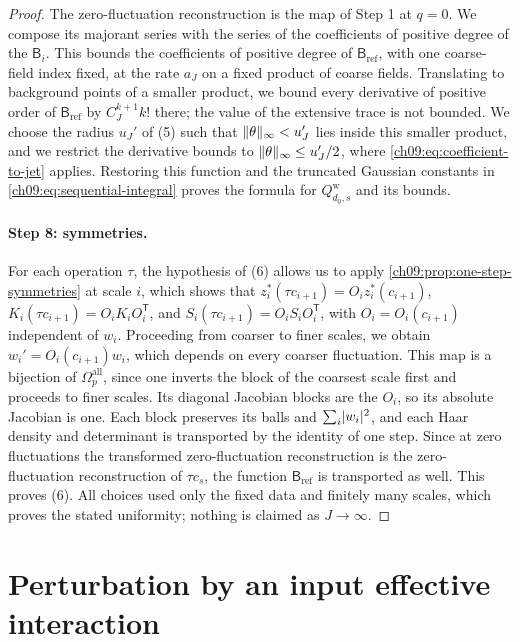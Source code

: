 \begin{proof}
The zero-fluctuation reconstruction is the map of Step 1 at $q=0$. We compose its majorant series with the series of the coefficients of positive degree of the $\mathsf B_i$. This bounds the coefficients of positive degree of $\mathsf B_{\mathrm{ref}}$, with one coarse-field index fixed, at the rate $a_J$ on a fixed product of coarse fields. Translating to background points of a smaller product, we bound every derivative of positive order of $\mathsf B_{\mathrm{ref}}$ by $C_J^{k+1}k!$ there; the value of the extensive trace is not bounded. We choose the radius $u_J'$ of (5) such that $\lVert \theta\rVert_\infty<u_J'$ lies inside this smaller product, and we restrict the derivative bounds to $\lVert \theta\rVert_\infty\le u_J'/2$, where \eqref{ch09:eq:coefficient-to-jet} applies. Restoring this function and the truncated Gaussian constants in \eqref{ch09:eq:sequential-integral} proves the formula for $Q_{d_0,s}^{\mathrm w}$ and its bounds.

\paragraph{Step 8: symmetries.}
For each operation $\tau$, the hypothesis of (6) allows us to apply \cref{ch09:prop:one-step-symmetries} at scale $i$, which shows that $z_i^*(\tau c_{i+1})=O_iz_i^*(c_{i+1})$, $K_i(\tau c_{i+1})=O_iK_iO_i^{\mathsf T}$, and $S_i(\tau c_{i+1})=O_iS_iO_i^{\mathsf T}$, with $O_i=O_i(c_{i+1})$ independent of $w_i$. Proceeding from coarser to finer scales, we obtain $w_i'=O_i(c_{i+1})w_i$, which depends on every coarser fluctuation. This map is a bijection of $\Omega_p^{\mathrm{all}}$, since one inverts the block of the coarsest scale first and proceeds to finer scales. Its diagonal Jacobian blocks are the $O_i$, so its absolute Jacobian is one. Each block preserves its balls and $\sum_i\lvert w_i\rvert^2$, and each Haar density and determinant is transported by the identity of one step. Since at zero fluctuations the transformed zero-fluctuation reconstruction is the zero-fluctuation reconstruction of $\tau c_s$, the function $\mathsf B_{\mathrm{ref}}$ is transported as well. This proves (6). All choices used only the fixed data and finitely many scales, which proves the stated uniformity; nothing is claimed as $J\to\infty$.
\end{proof}

\section{Perturbation by an input effective interaction}\label{ch09:sec:insertion}

